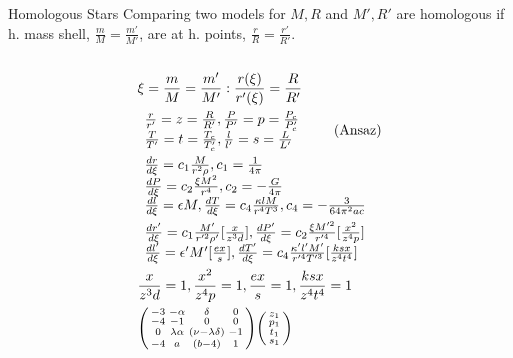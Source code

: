 \begin{frame}{Homologous Stars}
    Comparing two models for $M,R$ and $M',R'$ are homologous if h. mass shell, $\frac{m}{M}=\frac{m'}{M'}$, are at h. points, $\frac{r}{R}=\frac{r'}{R'}$.
    \begin{columns}[T]
        \begin{column}{0.55\textwidth}
            \begin{align*}
            &\xi=\frac{m}{M}=\frac{m'}{M'}: \frac{r(\xi)}{r'({\xi})}=\frac{R}{R'}\\
                &\begin{array}{l}
                \frac{r}{r'}=z=\frac{R}{R'},\frac{P}{P'}=p=\frac{P_c}{P_c'}\\
                \frac{T}{T'}=t=\frac{T_c}{T_c'},\frac{l}{l'}=s=\frac{L}{L'}
            \end{array}\tag{Ansaz}\\
            &\begin{array}{l}
                \TDy{\xi}{r}=c_1 \frac{M}{r^2\rho},c_1=\frac{1}{4\pi}\\
                \TDy{\xi}{P}=c_2 \frac{\xi M^2}{r^4},c_2=-\frac{G}{4\pi}\\
                \TDy{\xi}{l}=\epsilon M,\TDy{\xi}{T}=c_4 \frac{\kappa lM}{r^4T^3},c_4=-\frac{3}{64\pi^2ac}
            \end{array}\\
            &\begin{array}{l}
                \TDy{\xi}{r'}=c_1 \frac{M'}{r'^2\rho'}[\frac{x}{z^3d}],\TDy{\xi}{P'}=c_2 \frac{\xi M'^2}{r'^4}[\frac{x^2}{z^4p}]\\
                \TDy{\xi}{l'}=\epsilon'M'[\frac{ex}{s}],\TDy{\xi}{T'}=c_4 \frac{\kappa'l'M'}{r'^4T'^3}[\frac{ksx}{z^4t^4}]
            \end{array}\\
            &\frac{x}{z^3d}=1, \frac{x^2}{z^4p}=1, \frac{ex}{s}=1, \frac{ksx}{z^4t^4}=1\\
            &\begin{psmallmatrix}
                -3&-\alpha&\delta&0\\
                -4&-1&0&0\\
                0&\lambda\alpha&(\nu-\lambda\delta)&-1\\
                -4&a&(b-4)&1\\
            \end{psmallmatrix}
            \begin{psmallmatrix}
                z_1\\p_1\\t_1\\s_1\\

\end{psmallmatrix}
\end{align*}
\end{column}
\end{columns}
\end{frame}
